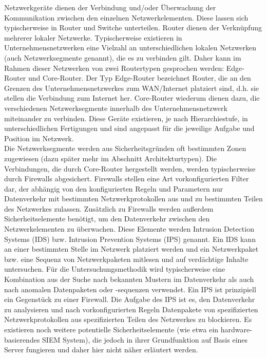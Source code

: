 Netzwerkgeräte dienen der Verbindung und/oder Überwachung der Kommunikation zwischen den einzelnen Netzwerkelementen. Diese lassen sich typischerweise in Router und Switche unterteilen. Router dienen der Verknüpfung mehrerer lokaler Netzwerke. Typischerweise existieren in Unternehmensnetzwerken eine Vielzahl an unterschiedlichen lokalen Netzwerken (auch Netzwerksegmente genannt), die es zu verbinden gilt. Daher kann im Rahmen dieser Netzwerken von zwei Routertypen gesprochen werden: \glqq Edge-Router\grqq{} und \glqq Core-Router\grqq . Der Typ Edge-Router bezeichnet Router, die an den Grenzen des Unternehmensnetzwerkes zum WAN/Internet platziert sind, d.h. sie stellen die Verbindung zum Internet her. Core-Router wiederum dienen dazu, die verschiedenen Netzwerksegmente innerhalb des Unternehmensnetzwerk miteinander zu verbinden. Diese Geräte existieren, je nach Hierarchiestufe, in unterschiedlichen Fertigungen und sind angepasst für die jeweilige Aufgabe und Position im Netzwerk.\\ 

Die Netzwerksegmente werden aus Sicherheitsgründen oft bestimmten Zonen zugewiesen (dazu später mehr im Abschnitt \glqq Architekturtypen\grqq). Die Verbindungen, die durch Core-Router hergestellt werden, werden typischerweise durch Firewalls abgesichert. Firewalls stellen eine Art vorkonfigurierten Filter dar, der abhängig von den konfigurierten Regeln und Parametern nur Datenverkehr mit bestimmten Netzwerkprotokollen aus und zu bestimmten Teilen des Netzwerkes zulassen.
Zusätzlich zu Firewalls werden außerdem Sicherheitselemente benötigt, um den Datenverkehr zwischen den Netzwerkelementen zu überwachen. Diese Elemente werden Intrusion Detection Systems (IDS) bzw. Intrusion Prevention Systems (IPS) genannt. Ein IDS kann an einer bestimmten Stelle im Netzwerk platziert werden und ein Netzwerkpaket bzw. eine Sequenz von Netzwerkpaketen mitlesen und auf verdächtige Inhalte untersuchen. Für die Untersuchungsmethodik wird typischerweise eine Kombination aus der Suche nach bekannten Mustern im Datenverkehr als auch nach anomalen Datenpaketen oder -sequenzen verwendet.
Ein IPS ist prinzipiell ein Gegenstück zu einer Firewall. Die Aufgabe des IPS ist es, den Datenverkehr zu analysieren und nach vorkonfigurierten Regeln Datenpakete von spezifizierten Netzwerkprotokollen aus spezifizierten Teilen des Netzwerkes zu blockieren.
Es existieren noch weitere potentielle Sicherheitselemente (wie etwa ein hardware-basierendes SIEM System), die jedoch in ihrer Grundfunktion auf Basis eines Server fungieren und daher hier nicht näher erläutert werden.


